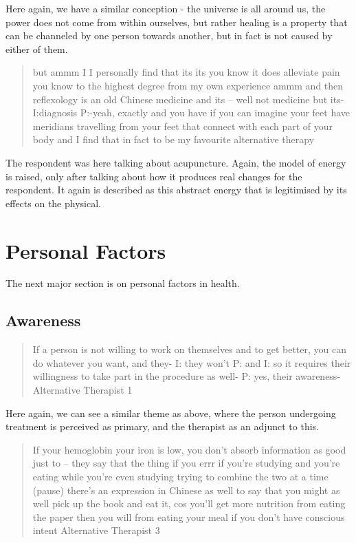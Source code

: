 Here again, we have a similar conception - the universe is all around us, the power does not come from within ourselves, but rather healing is a property that can be channeled by one person towards another, but in fact is not caused by either of them. 

\begin{quotation}
  but ammm I I personally find that its its you know it does alleviate pain you know to the highest degree from my own experience ammm and then reflexology is an old Chinese medicine and its – well not medicine but its-
I:diagnosis
P:-yeah, exactly and you have if you can imagine your feet have meridians travelling from your feet that connect with each part of your body and I find that in fact to be my favourite alternative therapy

\end{quotation}

The respondent was here talking about acupuncture. Again, the model of energy is raised, only after talking about how it produces real changes for the respondent. It again is described as this abstract energy that is legitimised by its effects on the physical. 

\section{Personal Factors}
\label{sec:personal-factors}

The next major section is on personal factors in health.

\subsection{Awareness}
\label{sec:awareness}

\begin{quotation}
  If a person is not willing to work on themselves and to get better, you can do whatever you want, and they-
I: they won't
P: and 
I: so it requires their willingness to take part in the procedure as well-
P: yes, their awareness-
Alternative Therapist 1
\end{quotation}


Here again, we can see a similar theme as above, where the person undergoing treatment is perceived as primary, and the therapist as an adjunct to this. 


\begin{quotation}
   If your hemoglobin your iron is low, you don't absorb information as good just to – they say that the thing if you errr if you're studying and you're eating while you're even studying trying to combine the two at a time (pause) there's an expression in Chinese as well to say that you might as well pick up the book and eat it, cos you'll get more nutrition from eating the paper then you will from eating your meal if you don't have conscious intent 
Alternative Therapist 3
\end{quotation}


